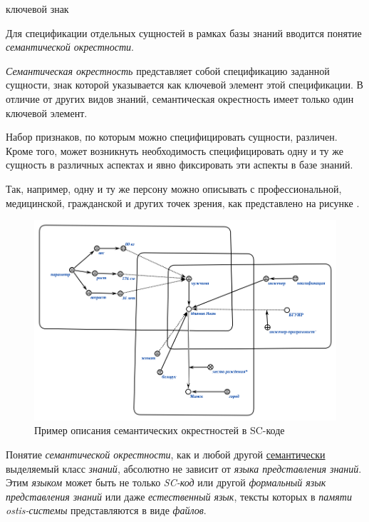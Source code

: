 \begin{SCn}
	\begin{scnrelfromlist}{ключевой знак}
	\end{scnrelfromlist}
\end{SCn}

Для спецификации отдельных сущностей в рамках базы знаний вводится понятие \textit{семантической окрестности}. 

\textit{Семантическая окрестность} представляет собой спецификацию заданной сущности, знак которой указывается как ключевой элемент этой спецификации. В отличие от других видов знаний, семантическая окрестность имеет только один ключевой элемент.

Набор признаков, по которым можно специфицировать сущности, различен. Кроме того, может возникнуть необходимость специфицировать одну и ту же сущность в различных аспектах и явно фиксировать эти аспекты в базе знаний.

Так, например, одну и ту же персону можно описывать с профессиональной, медицинской, гражданской и других точек зрения, как представлено на рисунке \textit{}. 

\begin{figure}[H]
	\includegraphics[scale=0.7]{author/part2/figures/chapter_kb/semantic_neighborhood.png}
	\caption{Пример описания семантических окрестностей в SC-коде}
	\label{fig:semantic_neighborhood}
\end{figure}

Понятие \textit{семантической окрестности}, как и любой другой \uline{семантически} выделяемый класс \textit{знаний}, абсолютно не зависит от \textit{языка представления знаний}. Этим \textit{языком} может быть не только \textit{SC-код} или другой \textit{формальный язык представления знаний} или даже \textit{естественный язык}, тексты которых в \textit{памяти ostis-системы} представляются в виде \textit{файлов}.

